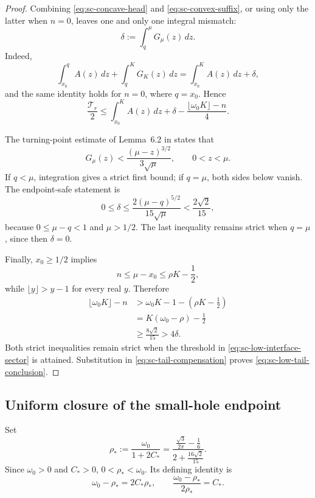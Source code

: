 \documentclass[11pt]{article}
\numberwithin{equation}{section}
\theoremstyle{definition}
\theoremstyle{remark}
\begin{document}
\begin{proof}
Combining \eqref{eq:sc-concave-head} and
\eqref{eq:sc-convex-suffix}, or using only the latter when \(n=0\), leaves
one and only one integral mismatch:
\begin{equation}
  \delta:=\int_q^\mu G_\mu(z)\,dz.
  \label{eq:sc-interface-loss}
\end{equation}
Indeed,
\[
  \int_{x_0}^{q}A(z)\,dz+\int_q^KG_K(z)\,dz
  =\int_{x_0}^KA(z)\,dz+\delta,
\]
and the same identity holds for \(n=0\), where \(q=x_0\).  Hence
\begin{equation}
  \frac{\mathcal T_r}{2}
  \le\int_{x_0}^KA(z)\,dz
  +\delta-\frac{\lfloor\omega_0K\rfloor-n}{4}.
  \label{eq:sc-tail-compensation}
\end{equation}

The turning-point estimate of Lemma~6.2 in \cite{FLPSannuli} states that
\begin{equation}
  G_\mu(z)<\frac{(\mu-z)^{3/2}}{3\sqrt\mu},
  \qquad 0<z<\mu.
  \label{eq:sc-turning-point-bound}
\end{equation}
If \(q<\mu\), integration gives a strict first bound; if \(q=\mu\), both
sides below vanish.  The endpoint-safe statement is
\begin{equation}
  0\le\delta
  \le\frac{2(\mu-q)^{5/2}}{15\sqrt\mu}
  <\frac{2\sqrt2}{15},
  \label{eq:sc-interface-loss-bound}
\end{equation}
because \(0\le\mu-q<1\) and \(\mu>1/2\).  The last inequality remains
strict when \(q=\mu\), since then \(\delta=0\).

Finally, \(x_0\ge1/2\) implies
\[
  n\le\mu-x_0\le\rho K-\frac12,
\]
while \(\lfloor y\rfloor>y-1\) for every real \(y\).  Therefore
\begin{align*}
  \lfloor\omega_0K\rfloor-n
  &>\omega_0K-1-\left(\rho K-\frac12\right)\\
  &=K(\omega_0-\rho)-\frac12\\
  &\ge\frac{8\sqrt2}{15}
  >4\delta.
\end{align*}
Both strict inequalities remain strict when the threshold in
\eqref{eq:sc-low-interface-sector} is attained.  Substitution in
\eqref{eq:sc-tail-compensation} proves
\eqref{eq:sc-low-tail-conclusion}.
\end{proof}

\subsection{Uniform closure of the small-hole endpoint}

Set
\begin{equation}
  \rho_*:=\frac{\omega_0}{1+2C_*}
  =\frac{\frac{\sqrt3}{2\pi}-\frac16}
  {2+\frac{16\sqrt2}{15}}.
  \label{eq:sc-rho-star}
\end{equation}
Since \(\omega_0>0\) and \(C_*>0\),
\(0<\rho_*<\omega_0\).  Its defining identity is
\begin{equation}
  \omega_0-\rho_*=2C_*\rho_*,
  \qquad
  \frac{\omega_0-\rho_*}{2\rho_*}=C_*.
  \label{eq:sc-rho-star-identity}
\end{equation}
\end{document}
